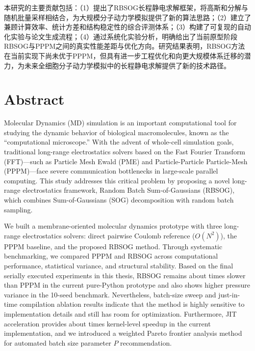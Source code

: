 本研究的主要贡献包括：（1）提出了RBSOG长程静电求解框架，将高斯和分解与随机批量采样相结合，为大规模分子动力学模拟提供了新的算法思路；（2）建立了兼顾计算效率、统计方差和结构稳定性的综合评测体系；（3）构建了可复现的自动化实验与论文生成流程；（4）通过系统化实验分析，明确给出了当前原型阶段RBSOG与PPPM之间的真实性能差距与优化方向。研究结果表明，RBSOG方法在当前实现下尚未优于PPPM，但具有进一步工程优化和向更大规模体系迁移的潜力，为未来全细胞分子动力学模拟中的长程静电求解提供了新的技术路径。

\chapter*{Abstract}%

Molecular Dynamics (MD) simulation is an important computational tool for studying the dynamic behavior of biological macromolecules, known as the ``computational microscope.'' With the advent of whole-cell simulation goals, traditional long-range electrostatics solvers based on the Fast Fourier Transform (FFT)---such as Particle Mesh Ewald (PME) and Particle-Particle Particle-Mesh (PPPM)---face severe communication bottlenecks in large-scale parallel computing. This study addresses this critical problem by proposing a novel long-range electrostatics framework, Random Batch Sum-of-Gaussians (RBSOG), which combines Sum-of-Gaussians (SOG) decomposition with random batch sampling.

We built a membrane-oriented molecular dynamics prototype with three long-range electrostatics solvers: direct pairwise Coulomb reference ($O(N^2)$), the PPPM baseline, and the proposed RBSOG method. Through systematic benchmarking, we compared PPPM and RBSOG across computational performance, statistical variance, and structural stability. Based on the final serially executed experiments in this thesis, RBSOG remains about \RBSOGSlowdownVsPPPM{} times slower than PPPM in the current pure-Python prototype and also shows higher pressure variance in the 10-seed benchmark. Nevertheless, batch-size sweep and just-in-time compilation ablation results indicate that the method is highly sensitive to implementation details and still has room for optimization. Furthermore, JIT acceleration provides about \JITSpeedup{} times kernel-level speedup in the current implementation, and we introduced a weighted Pareto frontier analysis method for automated batch size parameter $P$ recommendation.

